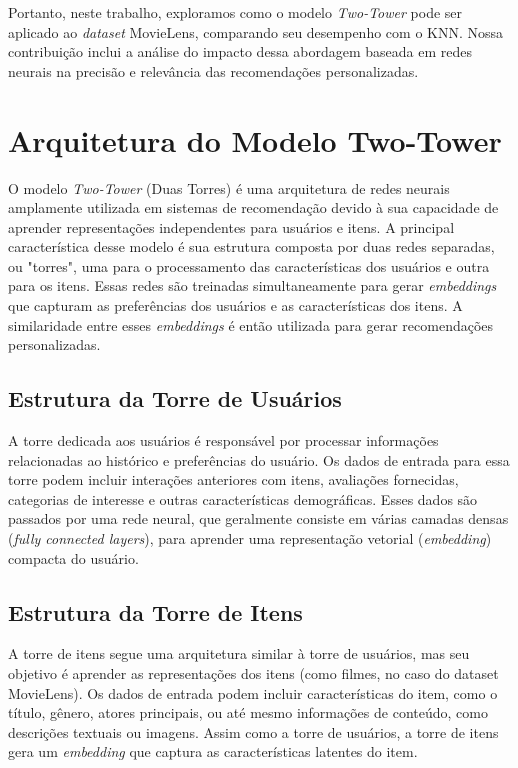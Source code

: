 \documentclass[sigconf]{acmart}
\begin{document}
Portanto, neste trabalho, exploramos como o modelo \textit{Two-Tower} pode ser aplicado ao \textit{dataset} MovieLens, comparando seu desempenho com o KNN. Nossa contribuição inclui a análise do impacto dessa abordagem baseada em redes neurais na precisão e relevância das recomendações personalizadas.

\section{Arquitetura do Modelo Two-Tower}

O modelo \textit{Two-Tower} (Duas Torres) é uma arquitetura de redes neurais amplamente utilizada em sistemas de recomendação devido à sua capacidade de aprender representações independentes para usuários e itens. A principal característica desse modelo é sua estrutura composta por duas redes separadas, ou "torres", uma para o processamento das características dos usuários e outra para os itens. Essas redes são treinadas simultaneamente para gerar \textit{embeddings} que capturam as preferências dos usuários e as características dos itens. A similaridade entre esses \textit{embeddings} é então utilizada para gerar recomendações personalizadas.

\subsection{Estrutura da Torre de Usuários}

A torre dedicada aos usuários é responsável por processar informações relacionadas ao histórico e preferências do usuário. Os dados de entrada para essa torre podem incluir interações anteriores com itens, avaliações fornecidas, categorias de interesse e outras características demográficas. Esses dados são passados por uma rede neural, que geralmente consiste em várias camadas densas (\textit{fully connected layers}), para aprender uma representação vetorial (\textit{embedding}) compacta do usuário.

\subsection{Estrutura da Torre de Itens}

A torre de itens segue uma arquitetura similar à torre de usuários, mas seu objetivo é aprender as representações dos itens (como filmes, no caso do dataset MovieLens). Os dados de entrada podem incluir características do item, como o título, gênero, atores principais, ou até mesmo informações de conteúdo, como descrições textuais ou imagens. Assim como a torre de usuários, a torre de itens gera um \textit{embedding} que captura as características latentes do item. 
\end{document}
